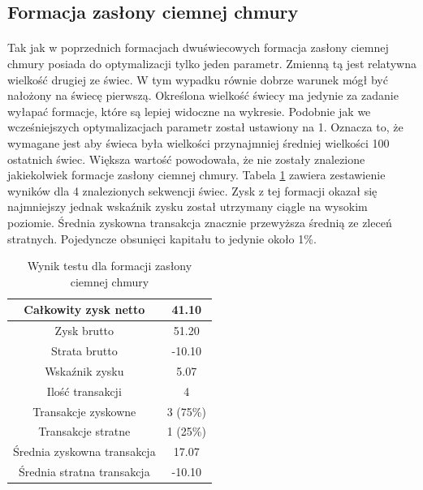 \documentclass[pdflatex,11pt]{aghdpl}
\begin{document}
\subsection{Formacja zasłony ciemnej chmury}
\paragraph{}

Tak jak w poprzednich formacjach dwuświecowych formacja zasłony ciemnej chmury posiada do optymalizacji tylko jeden parametr. Zmienną tą jest relatywna wielkość drugiej ze świec. W tym wypadku równie dobrze warunek mógł być nałożony na świecę pierwszą. Określona wielkość świecy ma jedynie za zadanie wyłapać formacje, które są lepiej widoczne na wykresie. Podobnie jak we wcześniejszych optymalizacjach parametr został ustawiony na 1. Oznacza to, że wymagane jest aby świeca była wielkości przynajmniej średniej wielkości 100 ostatnich świec. Większa wartość powodowała, że nie zostały znalezione jakiekolwiek formacje zasłony ciemnej chmury. Tabela \ref{raport_zaslona} zawiera zestawienie wyników dla 4 znalezionych sekwencji świec. Zysk z tej formacji okazał się najmniejszy jednak wskaźnik zysku został utrzymany ciągle na wysokim poziomie. Średnia zyskowna transakcja znacznie przewyższa średnią ze zleceń stratnych. Pojedyncze obsunięci kapitału to jedynie około 1\%. 
\begin{table}[h!]
\begin{center}
\begin{tabular}{|c|c|}
\hline 
Całkowity zysk netto & 41.10\\
\hline
Zysk brutto & 51.20\\
\hline
Strata brutto & -10.10\\
\hline
Wskaźnik zysku & 5.07 \\
\hline
\hline
Ilość transakcji & 4 \\
\hline
Transakcje zyskowne & 3 (75\%) \\
\hline
Transakcje stratne & 1 (25\%) \\
\hline
\hline
Średnia zyskowna transakcja & 17.07 \\
\hline
Średnia stratna transakcja & -10.10 \\
\hline
\end{tabular} 
\caption{Wynik testu dla formacji zasłony ciemnej chmury}
\label{raport_zaslona}
\end{center}
\end{table}
\end{document}
